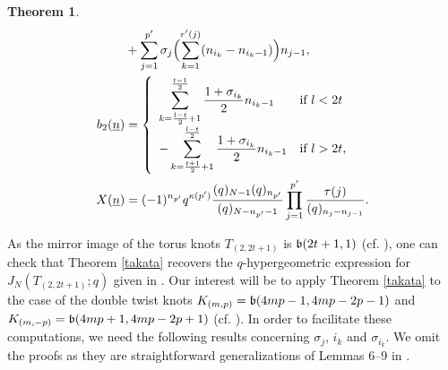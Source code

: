 \documentclass[11pt,reqno]{amsart}
\newtheorem{theorem}{Theorem}[section]
\theoremstyle{definition}
\numberwithin{equation}{section}
\begin{document}
\begin{theorem}
\begin{equation*}
\begin{aligned}
& + \sum_{j=1}^{p^{\prime}} \sigma_j \Bigl( \sum_{k=1}^{r^{\prime}(j)} (n_{i_k} - n_{i_k - 1}) \Bigr) n_{j-1}, \\
b_2(\underline{n}) & = \left\{
\begin{array}{ll}
\displaystyle \sum_{k=\frac{l-t}{2} + 1}^{\frac{t-1}{2}} \frac{1+ \sigma_{i_k}}{2} n_{i_k - 1} & \text{if $l < 2t$} \\
\displaystyle - \sum_{k=\frac{t+1}{2} + 1}^{\frac{l-t}{2}} \frac{1+ \sigma_{i_k}}{2} n_{i_k - 1} & \text{if $l > 2t,$} \\
\end{array} \right. \\
X(\underline{n}) & = (-1)^{n_{p^{\prime}}} q^{\kappa(p^{\prime})} \frac{(q)_{N-1} (q)_{n_{p^{\prime}}}}{(q)_{N-n_{p^{\prime}} - 1}} \prod_{j=1}^{p^{\prime}} \frac{\tau(j)}{(q)_{n_j - n_{j-1}}}.
\end{aligned}
\end{equation*}

\end{theorem}
 
As the mirror image of the torus knots $T_{(2, 2t+1)}$ is $\frak{b}(2t+1, 1)$ (cf. \cite{bz, petersen, Tran}), one can check that Theorem \ref{takata} recovers the $q$-hypergeometric expression for $J_N(T_{(2, 2t+1)}; q)$ given in \cite{hikami1, hikami2}. Our interest will be to apply Theorem \ref{takata} to the case of the double twist knots $K_{(m, p)} = \frak{b}(4mp-1, 4mp-2p-1)$ and $K_{(m,-p)}=\frak{b}(4mp+1, 4mp-2p+1)$ (cf. \cite{Tran}). In order to facilitate these computations, we need the following results concerning $\sigma_j$, $i_k$ and $\sigma_{i_k}$. We omit the proofs as they are straightforward generalizations of Lemmas 6--9 in \cite{takata}.
 
\end{document}
